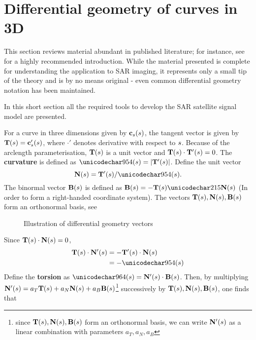 \section{Differential geometry of curves in 3D}
\label{sc:diffgeoreview}
This section reviews material abundant in published literature; for instance, see \cite{WoodDiffGeo} for a highly recommended introduction. While the material presented is complete for understanding the application to SAR imaging, it represents only a small tip of the theory and is by no means original - even common differential geometry notation has been maintained.
\par
In this short section all the required tools to develop the SAR satellite signal model are presented.
\par
For a curve in three dimensions given by $\mathbf{c}_s(s)$, the tangent vector is given by $\mathbf{T}(s) = \mathbf{c}_s'(s)$, where $\cdot'$ denotes derivative with respect to $s$. Because of the arclength parameterisation, $\mathbf{T}(s)$ is a unit vector and $\mathbf{T}(s)\cdot\mathbf{T}'(s)=0$. The \textbf{curvature} is defined as $\kappa(\parm) =\lvert\vct{T}'(\parm)\rvert$. Define the unit vector 
\begin{equation}
\vct{N}(\parm) = \vct{T}'(\parm)/\kappa(\parm). 
\end{equation}
The binormal vector $\mathbf{B}(s)$ is defined as $\vct{B}(\parm) = -\vct{T}(\parm)\times\vct{N}(\parm)$ (In order to form a right-handed coordinate system). The vectors $\mathbf{T}(s), \mathbf{N}(s), \mathbf{B}(s)$ form an orthonormal basis, see 
\begin{figure}[ht!]
    \begin{center}
    \resizebox{0.8\textwidth}{!}{}
	\caption{Illustration of differential geometry vectors}
	\label{fg:diffvectors}
	\end{center}
\end{figure}
\par
Since $\mathbf{T}(s)\cdot\mathbf{N}(s)=0$,
\begin{equation}
\begin{split}
 \vct{T}(\parm)\cdot\vct{N}'(\parm)&=-\vct{T}'(\parm)\cdot\vct{N}(\parm)\\
 &=-\kappa(\parm)
\end{split}
\end{equation}
Define the \textbf{torsion} as $\tau(\parm) = \vct{N}'(\parm)\cdot\vct{B}(\parm)$. Then, by multiplying $\mathbf{N}'(s)=a_T\mathbf{T}(s) + a_N\mathbf{N}(s) + a_B\mathbf{B}(s)$\footnote{since $\mathbf{T}(s), \mathbf{N}(s), \mathbf{B}(s)$ form an orthonormal basis, we can write $\mathbf{N}'(s)$ as a linear combination with parameters $a_T, a_N, a_B$} successively by $\mathbf{T}(s),\mathbf{N}(s),\mathbf{B}(s)$, one finds that
